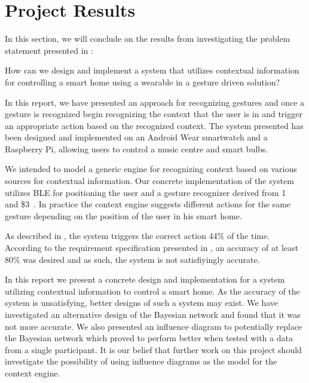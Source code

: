 \section{Project Results}
\label{sec:results}

In this section, we will conclude on the results from investigating the problem statement presented in :

\begin{framed}
\noindent How can we design and implement a system that utilizes contextual information for controlling a smart home using a wearable in a gesture driven solution?
\end{framed}

In this report, we have presented an approach for recognizing gestures and once a gesture is recognized begin recognizing the context that the user is in and trigger an appropriate action based on the recognized context. The system presented has been designed and implemented on an Android Wear smartwatch and a Raspberry Pi, allowing users to control a music centre and smart bulbs.

We intended to model a generic engine for recognizing context based on various sources for contextual information. Our concrete implementation of the system utilizes BLE for positioning the user and a gesture recognizer derived from 1\textcent~\cite{herold20121} and \$3~\cite{threedollar}. In practice the context engine suggests different actions for the same gesture depending on the position of the user in his smart home.

As described in , the system triggers the correct action 44\% of the time. According to the requirement specification presented in , an accuracy of at least 80\% was desired and as such, the system is not satisfiyingly accurate.

In this report we present a concrete design and implementation for a system utilizing contextual information to control a smart home. As the accuracy of the system is unsatisfying, better designs of such a system may exist. We have investigated an alternative design of the Bayesian network and found that it was not more accurate.
We also presented an influence diagram to potentially replace the Bayesian network which proved to perform better when tested with a data from a single participant.
It is our belief that further work on this project should investigate the possibility of using influence diagrams as the model for the context engine.

